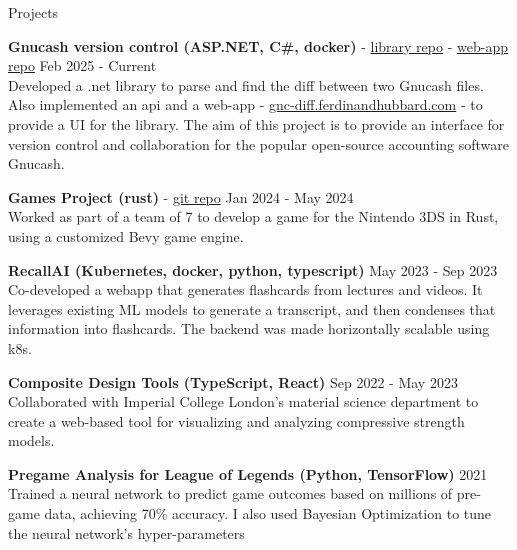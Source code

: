 \documentclass{resume} %
\begin{document}

\begin{rSection}{Projects}
\vspace{-1.25em}

\item \textbf{Gnucash version control (ASP.NET, C\#, docker)} - \href{https://github.com/ferdinandhubbard981/gnucash-diff}{library repo} - \href{https://github.com/ferdinandhubbard981/gnucash-version-control-web}{web-app repo} \hfill Feb 2025 - Current \\
Developed a .net library to parse and find the diff between two Gnucash files. Also implemented an api and a web-app - \href{https://gnc-diff.ferdinandhubbard.com}{gnc-diff.ferdinandhubbard.com} - to provide a UI for the library. The aim of this project is to provide an interface for version control and collaboration for the popular open-source accounting software Gnucash.

\item \textbf{Games Project (rust)} - \href{https://github.com/Team-Yarg/these\_times\_of\_mine}{git repo} \hfill Jan 2024 - May 2024 \\
Worked as part of a team of 7 to develop a game for the Nintendo 3DS in Rust, using a customized Bevy game engine.

\item \textbf{RecallAI (Kubernetes, docker, python, typescript)} \hfill May 2023 - Sep 2023 \\
Co-developed a webapp that generates flashcards from lectures and videos. It leverages existing ML models to generate a transcript, and then condenses that information into flashcards. The backend was made horizontally scalable using k8s.

\item \textbf{Composite Design Tools (TypeScript, React)} \hfill Sep 2022 - May 2023 \\
Collaborated with Imperial College London's material science department to create a web-based tool for visualizing and analyzing compressive strength models.

\item \textbf{Pregame Analysis for League of Legends (Python, TensorFlow)} \hfill 2021 \\
Trained a neural network to predict game outcomes based on millions of pre-game data, achieving 70\% accuracy. I also used Bayesian Optimization to tune the neural network's hyper-parameters

\end{rSection}
\end{document}
